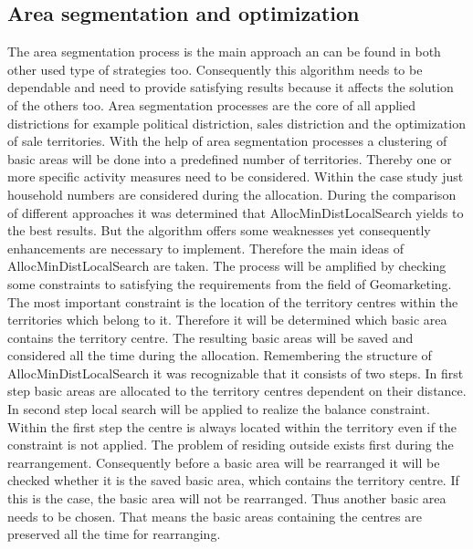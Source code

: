 \subsection{Area segmentation and optimization}\label{areaseg}
The area segmentation process is the main approach an can be found in both other used type of strategies too. Consequently this algorithm needs to be dependable and need to provide satisfying results because it affects the solution of the others too. Area segmentation processes are the core of all applied districtions for example political distriction, sales distriction and the optimization of sale territories. With the help of area segmentation processes a clustering of basic areas will be done into a predefined number of territories. Thereby one or more specific activity measures need to be considered. Within the case study just household numbers are considered during the allocation. During the comparison of different approaches it was determined that AllocMinDistLocalSearch yields to the best results. But the algorithm offers some weaknesses yet consequently enhancements are necessary to implement. Therefore the main ideas of AllocMinDistLocalSearch are taken. The process will be amplified by checking some constraints to satisfying the requirements from the field of Geomarketing. The most important constraint is the location of the territory centres within the territories which belong to it. Therefore it will be determined which basic area contains the territory centre. The resulting basic areas will be saved and considered all the time during the allocation. Remembering the structure of AllocMinDistLocalSearch it was recognizable that it consists of two steps. In first step basic areas are allocated to the territory centres dependent on their distance. In second step local search will be applied to realize the balance constraint. Within the first step the centre is always located within the territory even if the constraint is not applied. The problem of residing outside exists first during the rearrangement. Consequently before a basic area will be rearranged it will be checked whether it is the saved basic area, which contains the territory centre. If this is the case, the basic area will not be rearranged. Thus another basic area needs to be chosen. That means the basic areas containing the centres are preserved all the time for rearranging. \\
